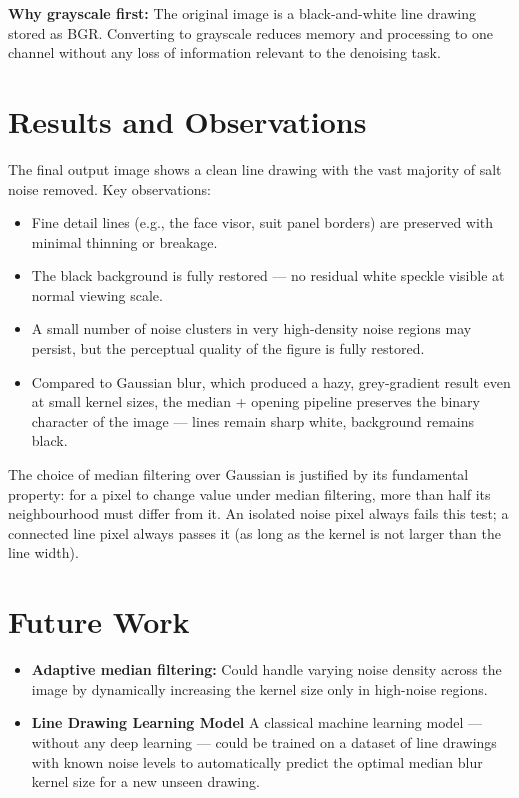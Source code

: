 \documentclass[journal]{IEEEtran}
\begin{document}
\textbf{Why grayscale first:} The original image is a black-and-white line drawing 
stored as BGR. Converting to grayscale reduces memory and processing to one channel 
without any loss of information relevant to the denoising task.

\section{Results and Observations}
The final output image shows a clean line drawing with the vast majority of salt 
noise removed. Key observations:

\begin{itemize}
    \item Fine detail lines (e.g., the face visor, suit panel borders) are preserved 
    with minimal thinning or breakage.
    \item The black background is fully restored — no residual white speckle visible 
    at normal viewing scale.
    \item A small number of noise clusters in very high-density noise regions may 
    persist, but the perceptual quality of the figure is fully restored.
    \item Compared to Gaussian blur, which produced a hazy, grey-gradient result 
    even at small kernel sizes, the median + opening pipeline preserves the binary 
    character of the image — lines remain sharp white, background remains black.
\end{itemize}

The choice of median filtering over Gaussian is justified by its fundamental property: 
for a pixel to change value under median filtering, more than half its neighbourhood 
must differ from it. An isolated noise pixel always fails this test; a connected line 
pixel always passes it (as long as the kernel is not larger than the line width).

\section{Future Work}
\begin{itemize}
    \item \textbf{Adaptive median filtering:} Could handle varying noise density 
    across the image by dynamically increasing the kernel size only in high-noise regions.
    \item \textbf{Line Drawing Learning Model} A classical machine learning model — without any deep learning — could be trained on a dataset of line drawings with known noise levels to automatically predict the optimal median blur kernel size for a new unseen drawing.
    
\end{itemize}
\end{document}

